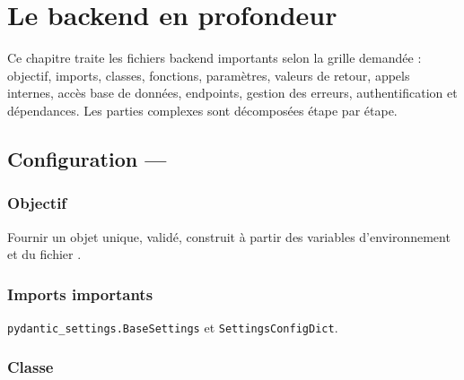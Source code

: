 \chapter{Le backend en profondeur}
\label{ch:backend}

Ce chapitre traite les fichiers backend importants selon la grille demandée :
objectif, imports, classes, fonctions, paramètres, valeurs de retour, appels
internes, accès base de données, endpoints, gestion des erreurs,
authentification et dépendances. Les parties complexes sont décomposées étape
par étape.

\section{Configuration --- }

\subsection*{Objectif}
Fournir un objet  unique, validé, construit à partir des variables
d'environnement et du fichier .

\subsection*{Imports importants}
\texttt{pydantic\_settings.BaseSettings} et \texttt{SettingsConfigDict}.

\subsection*{Classe }

